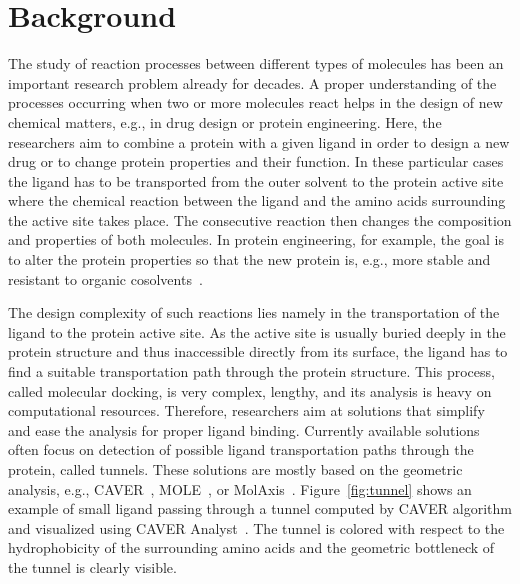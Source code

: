 \documentclass[twocolumn]{bmcart}%
\begin{document}

\section*{Background}
The study of reaction processes between different types of molecules has been an important research problem already for decades.
A proper understanding of the processes occurring when two or more molecules react helps in the design of new chemical matters, e.g., in drug design or protein engineering.
Here, the researchers aim to combine a protein with a given ligand in order to design a new drug or to change protein properties and their function.
In these particular cases the ligand has to be transported from the outer solvent to the protein active site where the chemical reaction between the ligand and the amino acids surrounding the active site takes place.
The consecutive reaction then changes the composition and properties of both molecules. 
In protein engineering, for example, the goal is to alter the protein properties so that the new protein is, e.g., more stable and resistant to organic cosolvents~\cite{Koudelakova2013}.

The design complexity of such reactions lies namely in the transportation of the ligand to the protein active site.
As the active site is usually buried deeply in the protein structure and thus inaccessible directly from its surface, the ligand has to find a suitable transportation path through the protein structure.
This process, called molecular docking, is very complex, lengthy, and its analysis is heavy on computational resources. 
Therefore, researchers aim at solutions that simplify and ease the analysis for proper ligand binding.
Currently available solutions often focus on detection of possible ligand transportation paths through the protein, called tunnels.
These solutions are mostly based on the geometric analysis, e.g., CAVER~\cite{Chovancova2012}, MOLE~\cite{Sehnal2013}, or MolAxis~\cite{Yaffe2008}.
Figure~\ref{fig:tunnel} shows an example of small ligand passing through a tunnel computed by CAVER algorithm and visualized using CAVER Analyst~\cite{Kozlikova2014}. 
The tunnel is colored with respect to the hydrophobicity of the surrounding amino acids and the geometric bottleneck of the tunnel is clearly visible.
\end{document}
